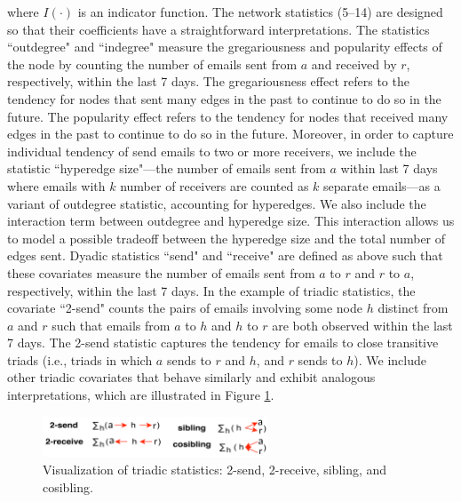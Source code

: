 \documentclass[ba]{imsart}
\numberwithin{equation}{section}
\theoremstyle{plain}
\begin{document}
	where $I(\cdot)$ is an indicator function. The network statistics (5--14) are designed so that their coefficients have a straightforward interpretations. The statistics ``outdegree" and ``indegree" measure the gregariousness and popularity effects of the node by counting the number of emails sent from $a$ and received by $r$, respectively, within the last 7 days. The gregariousness effect refers to the tendency for nodes that sent many edges in the past to continue to do so in the future. The popularity effect refers to the tendency for nodes that received many edges in the past to continue to do so in the future. Moreover, in order to capture individual tendency of send emails to two or more receivers, we include the statistic ``hyperedge size"---the number of emails sent from $a$ within last 7 days where emails with $k$ number of receivers are counted as $k$ separate emails---as a variant of outdegree statistic, accounting for hyperedges. We also include the interaction term between outdegree and hyperedge size. This interaction allows us to model a possible tradeoff between the hyperedge size and the total number of edges sent. Dyadic statistics ``send" and ``receive" are defined as above such that these covariates measure the number of emails sent from $a$ to $r$ and $r$ to $a$, respectively, within the last 7 days. In the example of triadic statistics, the covariate ``2-send" counts the pairs of emails involving some node $h$ distinct from $a$ and $r$ such that emails from $a$ to $h$ and $h$ to $r$ are both observed within the last 7 days. The 2-send statistic captures the tendency for emails to close transitive triads (i.e., triads in which $a$ sends to $r$ and $h$, and $r$ sends to $h$). We include other triadic covariates that behave similarly and exhibit analogous interpretations, which are illustrated in Figure \ref{figure:netstats}.
	\begin{figure}[!t]
		\centering
		\includegraphics[width=0.6\textwidth]{img/triad-1.png}	
		\caption {Visualization of triadic statistics: 2-send, 2-receive, sibling, and cosibling.}
		\label{figure:netstats}
	\end{figure}
	
\end{document}
